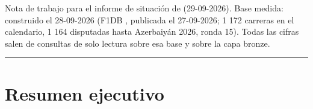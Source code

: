 Nota de trabajo para el informe de situación de  (29-09-2026). Base medida:  construido el 28-09-2026 (F1DB , publicada el 27-09-2026; 1 172 carreras en el calendario, 1 164 disputadas hasta Azerbaiyán 2026, ronda 15). Todas las cifras salen de consultas de solo lectura sobre esa base y sobre la capa bronze.

\medskip\noindent\textcolor{muted!40}{\rule{\linewidth}{0.3pt}}\medskip

\section{Resumen ejecutivo}

